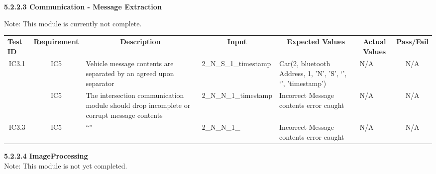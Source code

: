 \documentclass [10pt]{article}
\begin{document}
     \textbf{5.2.2.3 Communication - Message Extraction} 
     
     Note: This module is currently not complete.\\
     
 \begin{longtable}{ | p{ } | p{ } |  p{ } |  p{ } | p{ } | p{ } |  p{ } |}  \hline

    \rowcolor{subsectionC}\textbf{Test ID}
    & \multicolumn{1}{c|}{\textbf{Requirement} }
    &\multicolumn{1}{c|}{\textbf{Description} }
    & \multicolumn{1}{c|}{\textbf{Input} }
    & \multicolumn{1}{c|}{\textbf{Expected Values} }
    & \multicolumn{1}{c|}{\textbf{Actual Values} }
    & \multicolumn{1}{c|}{\textbf{Pass/Fail}} \\  
    
       \multicolumn{1}{|c|}{IC3.1} 
    & \multicolumn{1}{c|}{IC5}
    &Vehicle message contents are separated by an agreed upon separator
    & 2\_N\_S\_1\_timestamp
    & Car(2, bluetooth Address, 1, 'N', 'S', `', `', 'timestamp') 
    &  N/A
    & \multicolumn{1}{c|}{N/A}\\
    
    
    \rowcolor{tableCell}\multicolumn{1}{|c|}{IC3.2} 
    & \multicolumn{1}{c|}{IC5} 
    &The intersection communication module should drop incomplete or corrupt message contents
    & 2\_N\_N\_1\_timestamp
    & Incorrect Message contents error caught
    &  N/A
    & \multicolumn{1}{c|}{N/A}\\ 
    
    \multicolumn{1}{|c|}{IC3.3} 
    & \multicolumn{1}{c|}{IC5} 
    & ``''
    & 2\_N\_N\_1\_
    & Incorrect Message contents error caught
    &  N/A
    & \multicolumn{1}{c|}{N/A}\\ \hline
    
    \end{longtable}
    
    
    \textbf{5.2.2.4 ImageProcessing} \vspace{2mm}\\
    Note: This module is not yet completed. 
    
\end{document}
